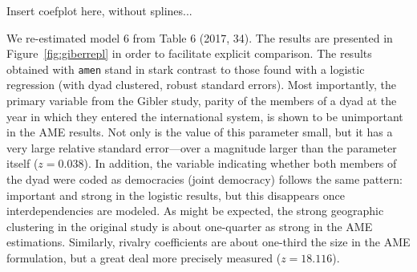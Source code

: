 Insert coefplot here, without splines...\label{fig:giberrepl}
%

We re-estimated model 6 from Table 6 (2017, 34). The results are presented in Figure~\ref{fig:giberrepl} in order to facilitate explicit comparison.
The results obtained with \texttt{amen} stand in stark contrast to those found with a logistic regression (with dyad clustered, robust standard errors).  Most importantly, the primary variable from the Gibler study, parity of the members of a dyad at the year in which they entered the international system, is shown to be unimportant in the AME results.  Not only is the value of this parameter small, but it has a very large relative standard error---over a magnitude larger than the parameter itself ($z= 0.038$). In addition, the variable indicating whether both members of the dyad were coded as democracies (joint democracy) follows the same pattern: important and strong in the logistic results, but this disappears once interdependencies are modeled.  As might be expected, the strong geographic clustering in the original study is about one-quarter as strong in the AME estimations. Similarly, rivalry coefficients are about one-third the size in the AME formulation, but a great deal more precisely measured ($z=18.116$). 

